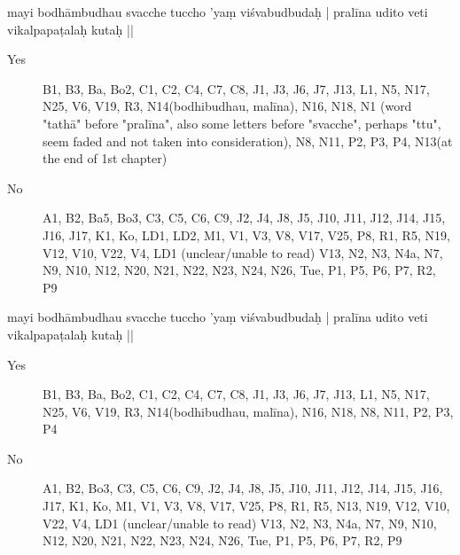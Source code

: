 \begin{ekdosis}
\begin{marma}[hp01_055]

mayi bodhāmbudhau svacche tuccho 'yaṃ viśvabudbudaḥ |
pralīna udito veti vikalpapaṭalaḥ kutaḥ ||

\begin{description}
\item[Yes] B1, B3, Ba, Bo2, C1, C2, C4, C7, C8, J1, J3, J6, J7, J13, L1, N5, N17, N25, V6, V19,
  R3, N14(bodhibudhau, malīna), N16, N18, N1 (word "tathā" before "pralīna", also some letters before "svacche", perhaps "ttu", seem faded and not taken into consideration), N8, N11, P2, P3, P4, N13(at the end of 1st chapter)
\item[No] A1, B2, Ba5, Bo3, C3, C5, C6, C9, J2, J4, J8, J5, J10, J11, J12, J14, J15, J16, J17, K1, Ko, LD1, LD2, M1,
  V1, V3, V8, V17, V25, P8, R1, R5, N19, V12, V10, V22, V4, LD1 (unclear/unable to read) V13, N2, N3, N4a, N7, N9, N10, N12, N20, N21, N22, N23, N24, N26, Tue, P1, P5, P6, P7, R2, P9
        \end{description}


mayi bodhāmbudhau svacche tuccho 'yaṃ viśvabudbudaḥ |
pralīna udito veti vikalpapaṭalaḥ kutaḥ ||

\begin{description}
\item[Yes] B1, B3, Ba, Bo2, C1, C2, C4, C7, C8, J1, J3, J6, J7, J13, L1, N5, N17, N25, V6, V19, R3,
 N14(bodhibudhau, malīna), N16, N18, N8, N11, P2, P3, P4
\item[No] A1, B2, Bo3, C3, C5, C6, C9, J2, J4, J8, J5, J10, J11, J12, J14, J15, J16, J17, K1, Ko, M1,
 V1, V3, V8, V17, V25, P8, R1, R5, N13, N19, V12, V10, V22, V4, LD1 (unclear/unable to read) V13, N2, N3, N4a, N7, N9, N10, N12, N20, N21, N22, N23, N24, N26, Tue, P1, P5, P6, P7, R2, P9
        \end{description}



\end{marma}
\end{ekdosis}
